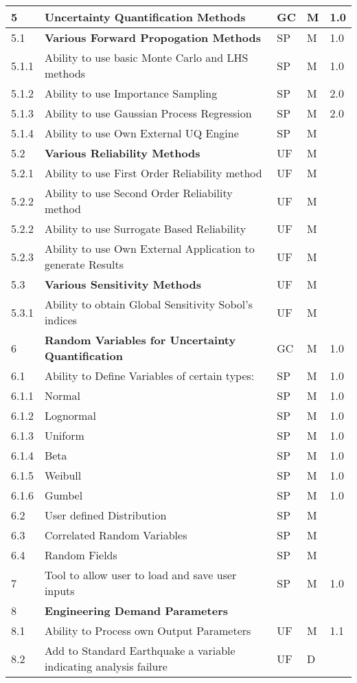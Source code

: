 \begin{longtable}{| p{} | p{} | p{} | p{} |  p{} |}
	5 & \textbf{Uncertainty Quantification Methods} &  GC & M & 1.0  \\ \hline
	5.1 & \textbf{Various Forward Propogation Methods} & SP & M & 1.0  \\ \hline
	5.1.1 & Ability to use basic  Monte Carlo and LHS methods & SP & M & 1.0 \\ \hline
	5.1.2 & Ability to use Importance Sampling  & SP & M & 2.0 \\ \hline
	5.1.3 & Ability to use Gaussian Process Regression & SP & M & 2.0 \\ \hline
	5.1.4 & Ability to use Own External UQ Engine & SP & M &  \\ \hline
	5.2 & \textbf{Various Reliability Methods} & UF & M &  \\ \hline
	5.2.1 & Ability to use First Order Reliability method & UF & M &  \\ \hline
	5.2.2 & Ability to use Second Order Reliability method & UF & M & \\ \hline
	5.2.2 & Ability to use Surrogate Based Reliability & UF & M & \\ \hline
	5.2.3 & Ability to use Own External Application to generate Results & UF & M &  \\ \hline
	5.3 & \textbf{Various Sensitivity Methods} & UF & M &  \\ \hline
	5.3.1 & Ability to obtain Global Sensitivity Sobol's indices & UF & M &  \\ \hline
    6 & \textbf{Random Variables for Uncertainty Quantification} & GC & M & 1.0  \\ \hline
    6.1 & Ability to Define Variables of certain types: & SP & M & 1.0  \\ 
    6.1.1 & Normal & SP & M  & 1.0 \\ \hline
    6.1.2 & Lognormal & SP & M & 1.0 \\ \hline
    6.1.3 & Uniform & SP & M & 1.0  \\ \hline
    6.1.4 & Beta & SP & M & 1.0 \\ \hline
    6.1.5 & Weibull &  SP & M  & 1.0 \\ \hline
    6.1.6 & Gumbel &  SP & M & 1.0  \\ \hline
    6.2 & User defined Distribution & SP & M &  \\ \hline
    6.3 & Correlated Random Variables & SP & M &  \\ \hline
    6.4 & Random Fields & SP & M &  \\ \hline
     7 & Tool to allow user to load and save user inputs & SP & M & 1.0 \\ \hline
    8 & \textbf{Engineering Demand Parameters} &  &  \\ \hline
    8.1 & Ability to Process own Output Parameters & UF & M & 1.1  \\ \hline
    8.2 & Add to Standard Earthquake a variable indicating analysis failure & UF & D &   \\ \hline


\end{longtable}
